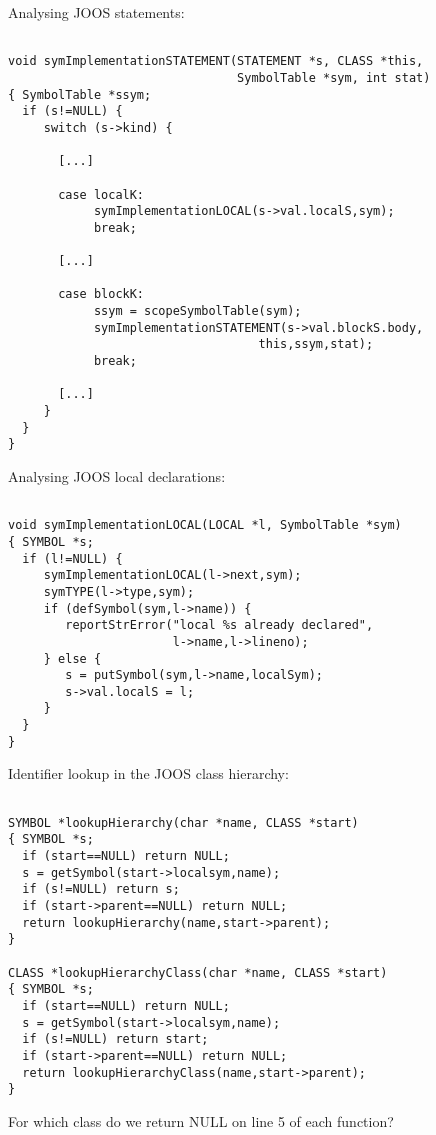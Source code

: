 \begin{slide*}
Analysing JOOS statements:

\begin{scriptsize}
\begin{verbatim}

void symImplementationSTATEMENT(STATEMENT *s, CLASS *this,
                                SymbolTable *sym, int stat)
{ SymbolTable *ssym;
  if (s!=NULL) {
     switch (s->kind) {
       
       [...]

       case localK:
            symImplementationLOCAL(s->val.localS,sym);
            break;
     
       [...]

       case blockK:
            ssym = scopeSymbolTable(sym);
            symImplementationSTATEMENT(s->val.blockS.body,
	                               this,ssym,stat);
            break;

       [...]
     }
  }
}
\end{verbatim}
\end{scriptsize}
\vfil
\end{slide*}

\begin{slide*}
Analysing JOOS local declarations:

\begin{scriptsize}
\begin{verbatim}

void symImplementationLOCAL(LOCAL *l, SymbolTable *sym)
{ SYMBOL *s;
  if (l!=NULL) {
     symImplementationLOCAL(l->next,sym);
     symTYPE(l->type,sym);
     if (defSymbol(sym,l->name)) {
        reportStrError("local %s already declared",
                       l->name,l->lineno);
     } else {
        s = putSymbol(sym,l->name,localSym);
        s->val.localS = l;
     }
  }
}
\end{verbatim}
\end{scriptsize}
\vfil
\end{slide*}

\begin{slide*}
Identifier lookup in the JOOS class hierarchy:

\begin{scriptsize}
\begin{verbatim}

SYMBOL *lookupHierarchy(char *name, CLASS *start)
{ SYMBOL *s;
  if (start==NULL) return NULL;
  s = getSymbol(start->localsym,name);
  if (s!=NULL) return s;
  if (start->parent==NULL) return NULL;
  return lookupHierarchy(name,start->parent);
}

CLASS *lookupHierarchyClass(char *name, CLASS *start)
{ SYMBOL *s;
  if (start==NULL) return NULL;
  s = getSymbol(start->localsym,name);
  if (s!=NULL) return start;
  if (start->parent==NULL) return NULL;
  return lookupHierarchyClass(name,start->parent);
}
\end{verbatim}
\end{scriptsize}

For which class do we return NULL on line 5 of each function?
\vfil
\end{slide*}
 
